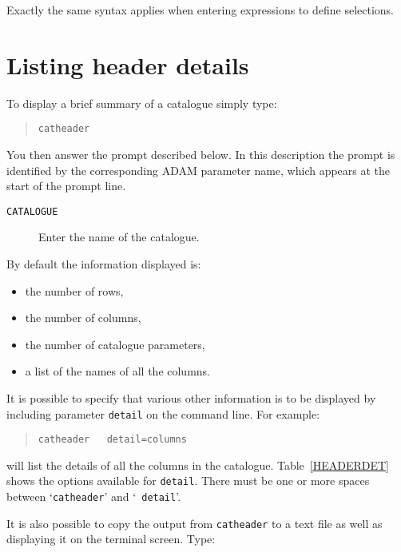 \documentclass[twoside,11pt]{article}
\newcommand{\xlabel}[1]{}
\renewcommand{\_}{\texttt{\symbol{95}}}
\begin{document}
Exactly the same syntax applies when entering expressions to define
selections.


\section{\xlabel{HEAD}\label{HEAD}Listing header details}

To display a brief summary of a catalogue simply type:

\begin{verse}
{\tt catheader}
\end{verse}

You then answer the prompt described below.  In this description the
prompt is identified by the corresponding ADAM parameter name, which
appears at the start of the prompt line.

\begin{description}

  \item[ {\tt CATALOGUE} ] Enter the name of the catalogue.

\end{description}

By default the information displayed is:

\begin{itemize}

  \item the number of rows,

  \item the number of columns,

  \item the number of catalogue parameters,

  \item a list of the names of all the columns.

\end{itemize}

It is possible to specify that various other information is to be
displayed by including parameter {\tt detail} on the command line.  For
example:

\begin{verse}
{\tt catheader ~ detail=columns}
\end{verse}

will list the details of all the columns in the catalogue.
Table~\ref{HEADERDET} shows the options available for {\tt detail}.
There must be one or more spaces between `{\tt catheader}' and `{\tt
detail}'.

It is also possible to copy the output from {\tt catheader} to a text
file as well as displaying it on the terminal screen.  Type:
\end{document}
